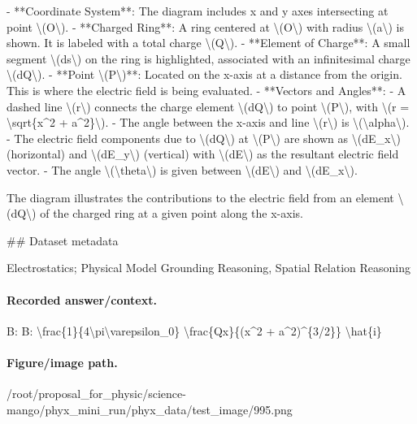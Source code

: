 - **Coordinate System**: The diagram includes x and y axes intersecting at point \textbackslash{}(O\textbackslash{}).
- **Charged Ring**: A ring centered at \textbackslash{}(O\textbackslash{}) with radius \textbackslash{}(a\textbackslash{}) is shown. It is labeled with a total charge \textbackslash{}(Q\textbackslash{}).
- **Element of Charge**: A small segment \textbackslash{}(ds\textbackslash{}) on the ring is highlighted, associated with an infinitesimal charge \textbackslash{}(dQ\textbackslash{}).
- **Point \textbackslash{}(P\textbackslash{})**: Located on the x-axis at a distance from the origin. This is where the electric field is being evaluated.
- **Vectors and Angles**: 
  - A dashed line \textbackslash{}(r\textbackslash{}) connects the charge element \textbackslash{}(dQ\textbackslash{}) to point \textbackslash{}(P\textbackslash{}), with \textbackslash{}(r = \textbackslash{}sqrt\{x\textasciicircum{}2 + a\textasciicircum{}2\}\textbackslash{}).
  - The angle between the x-axis and line \textbackslash{}(r\textbackslash{}) is \textbackslash{}(\textbackslash{}alpha\textbackslash{}).
  - The electric field components due to \textbackslash{}(dQ\textbackslash{}) at \textbackslash{}(P\textbackslash{}) are shown as \textbackslash{}(dE\_x\textbackslash{}) (horizontal) and \textbackslash{}(dE\_y\textbackslash{}) (vertical) with \textbackslash{}(dE\textbackslash{}) as the resultant electric field vector. 
  - The angle \textbackslash{}(\textbackslash{}theta\textbackslash{}) is given between \textbackslash{}(dE\textbackslash{}) and \textbackslash{}(dE\_x\textbackslash{}).

The diagram illustrates the contributions to the electric field from an element \textbackslash{}(dQ\textbackslash{}) of the charged ring at a given point along the x-axis.

\#\# Dataset metadata

Electrostatics; Physical Model Grounding Reasoning, Spatial Relation Reasoning

\paragraph{Recorded answer/context.}
B: B: \textbackslash{}frac\{1\}\{4\textbackslash{}pi\textbackslash{}varepsilon\_0\} \textbackslash{}frac\{Qx\}\{(x\textasciicircum{}2 + a\textasciicircum{}2)\textasciicircum{}\{3/2\}\} \textbackslash{}hat\{i\}

\paragraph{Figure/image path.}
/root/proposal\_for\_physic/science-mango/phyx\_mini\_run/phyx\_data/test\_image/995.png

